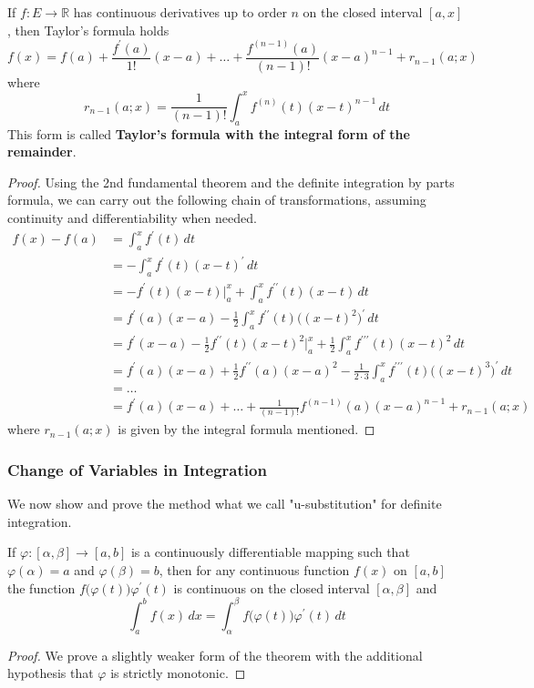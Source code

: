     \begin{theorem}
    If $f: E \longrightarrow \mathbb{R}$ has continuous derivatives up to order $n$ on the closed interval $[a, x]$, then Taylor's formula holds
    \[f(x) = f(a) + \frac{f^\prime (a)}{1!} (x - a) + \ldots + \frac{f^{(n-1)}(a)}{(n-1)!} (x - a)^{n-1} + r_{n-1}(a; x)\]
    where 
    \[r_{n-1} (a;x) = \frac{1}{(n-1)!} \int_a^x f^{(n)} (t) (x - t)^{n-1} \,dt\]
    This form is called \textbf{Taylor's formula with the integral form of the remainder}. 
    \end{theorem}
    \begin{proof}
    Using the 2nd fundamental theorem and the definite integration by parts formula, we can carry out the following chain of transformations, assuming continuity and differentiability when needed. 
    \begin{align*}
        f(x) - f(a) & = \int_a^x f^\prime (t) \,dt \\
        & = - \int_a^x f^\prime(t) (x - t)^\prime \,dt \\
        & = -f^\prime (t) (x - t)\big|_a^x + \int_a^x f^{\prime\prime} (t) (x - t) \,dt \\
        & = f^\prime (a) (x - a) - \frac{1}{2} \int_a^x f^{\prime\prime} (t) \big( (x - t)^2\big)^\prime \,dt \\
        & = f^\prime (x - a) - \frac{1}{2} f^{\prime\prime} (t) (x - t)^2 \big|_a^x + \frac{1}{2} \int_a^x f^{\prime\prime\prime} (t) (x - t)^2\,dt \\
        & = f^\prime(a) (x - a) + \frac{1}{2} f^{\prime\prime} (a) (x - a)^2 - \frac{1}{2 \cdot 3} \int_a^x f^{\prime\prime\prime} (t) \big((x - t)^3\big)^\prime\,dt \\
        & = \ldots \\
        & = f^\prime (a) (x - a) + \ldots + \frac{1}{(n-1)!} f^{(n-1)} (a)(x - a)^{n-1} + r_{n-1}(a;x)
    \end{align*}
    where $r_{n-1}(a;x)$ is given by the integral formula mentioned. 
    \end{proof}

    \subsubsection{Change of Variables in Integration}
    We now show and prove the method what we call "u-substitution" for definite integration. 

    \begin{theorem}
    If $\varphi: [\alpha, \beta] \longrightarrow [a, b]$ is a continuously differentiable mapping such that $\varphi(\alpha) = a$ and $\varphi(\beta) = b$, then for any continuous function $f(x)$ on $[a, b]$ the function $f\big(\varphi(t)\big) \varphi^\prime (t)$ is continuous on the closed interval $[\alpha, \beta]$ and 
    \[\int_a^b f(x)\,dx = \int_\alpha^\beta f\big(\varphi(t)\big) \varphi^\prime(t)\,dt\]
    \end{theorem}
    \begin{proof}
    We prove a slightly weaker form of the theorem with the additional hypothesis that $\varphi$ is strictly monotonic. 
    \end{proof}

